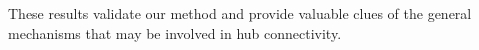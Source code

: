 \documentclass[10pt,letterpaper]{article}
\begin{document}
{%
These results validate our method and provide valuable clues of the general mechanisms that may be involved in hub connectivity.




}
\end{document}
